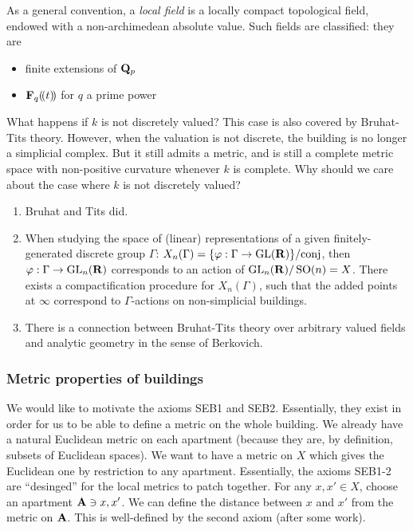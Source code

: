 As a general convention, a \emph{local field} is a locally compact 
topological field, endowed with a non-archimedean absolute value. Such 
fields are classified: they are 
\begin{itemize}
  \item finite extensions of $\mathbf{Q}_p$
  \item $\mathbf{F}_q(\! ( t )\! )$ for $q$ a prime power
\end{itemize}
What happens if $k$ is not discretely valued? This case is also covered by 
Bruhat-Tits theory. However, when the valuation is not discrete, the building 
is no longer a simplicial complex. But it still admits a metric, and is still 
a complete metric space with non-positive curvature whenever $k$ is complete. 
Why should we care about the case where $k$ is not discretely valued?
\begin{enumerate}
  \item Bruhat and Tits did.
  \item When studying the space of (linear) representations of a given finitely-generated 
    discrete group $\Gamma$: 
    $X_n(\Gamma)=\{\varphi:\Gamma \to \operatorname{GL}(\mathbf{R})\}/\text{conj}$, 
    then $\varphi:\Gamma \to \operatorname{GL}_n(\mathbf{R})$ corresponds to an action of 
    $\operatorname{GL}_n(\mathbf{R})/\operatorname{SO}(n)=X$. There exists a compactification 
    procedure for $X_n(\Gamma)$, such that the added points at $\infty$ 
    correspond to $\Gamma$-actions on non-simplicial buildings. 
  \item There is a connection between Bruhat-Tits theory over arbitrary valued 
    fields and analytic geometry in the sense of Berkovich. 
\end{enumerate}


\subsubsection{Metric properties of buildings}

We would like to motivate the axioms SEB1 and SEB2. Essentially, they 
exist in order for us to be able to define a metric on the whole building. We 
already have a natural Euclidean metric on each apartment (because they are, by 
definition, subsets of Euclidean spaces). We want to have a metric on $X$ which 
gives the Euclidean one by restriction to any apartment. Essentially, the 
axioms SEB1-2 are ``desinged'' for the local metrics to patch together. For any 
$x,x'\in X$, choose an apartment $\mathbf{A}\ni x,x'$. We can define the distance 
between $x$ and $x'$ from the metric on $\mathbf{A}$. This is well-defined by the second 
axiom (after some work). 

